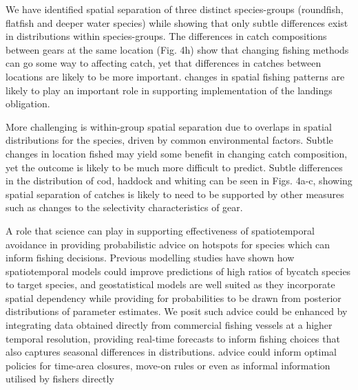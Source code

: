 \documentclass[12pt]{article}
\begin{document}
\begin{linenumbers}
 We have
identified spatial separation of three distinct species-groups (roundfish,
flatfish and deeper water species) while showing that only subtle differences
exist in distributions within species-groups. The differences in catch
compositions between gears at the same location (Fig. 4h) show that changing
fishing methods can go some way to affecting catch, yet that differences in
catches between locations are likely to be more important.  changes in spatial fishing patterns
are likely to play an important role in supporting implementation of the
landings obligation.

More challenging is within-group spatial separation due to
overlaps in spatial distributions for the species, driven
by common environmental factors. Subtle changes in location fished may yield
some benefit in changing catch composition, yet the outcome is likely to be
much more difficult to predict. Subtle differences in the
distribution of cod, haddock and whiting can be seen in Figs. 4a-c, showing
spatial separation of catches is likely to need to be supported by other measures such as changes to
the selectivity characteristics of gear\cite{Santos2016}. 

A role that science can play in supporting effectiveness of spatiotemporal
avoidance in providing probabilistic advice
on hotspots for species which can inform fishing decisions. Previous modelling studies
have shown how spatiotemporal models could improve predictions of high ratios
of bycatch species to target species\cite{Ward2015, Cosandey-Godin2015,
	Breivik2016}, and geostatistical models are well suited as they incorporate spatial dependency while providing for
probabilities to be drawn from posterior distributions of parameter
estimates. We posit such advice could be enhanced by integrating
data obtained directly from commercial fishing vessels at a higher temporal
resolution, providing real-time forecasts to inform fishing choices that also
captures seasonal differences in distributions.  advice could inform optimal policies for
time-area closures, move-on rules or even as informal information utilised by fishers directly


\end{linenumbers}
\end{document}
